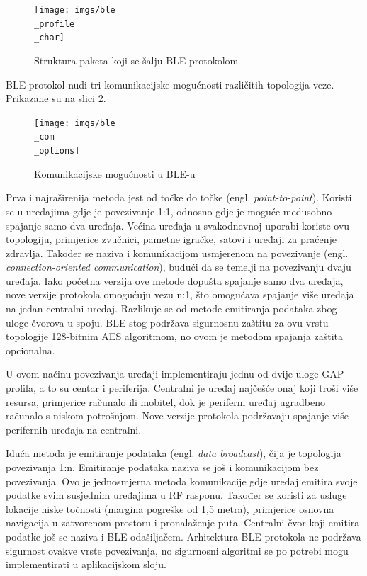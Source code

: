 \begin{figure}[ht]
	\centering
	\texttt{[image: imgs/ble\\\_profile\\\_char]}
	\caption{Struktura paketa koji se šalju BLE protokolom \cite{ble_profile_char}}
	\label{fig:ble_profile_char}
\end{figure}


BLE protokol nudi tri komunikacijske mogućnosti različitih topologija veze. Prikazane su na slici \ref{fig:ble_com_options}. 

\begin{figure}[ht]
	\centering
	\texttt{[image: imgs/ble\\\_com\\\_options]}
	\caption{Komunikacijske mogućnosti u BLE-u \cite{ble_profiles}}
	\label{fig:ble_com_options}
\end{figure}

Prva i najraširenija metoda jest od točke do točke (engl. \textit{point-to-point}). Koristi se u uređajima gdje je povezivanje 1:1, odnosno gdje je moguće međusobno spajanje samo dva uređaja. Većina uređaja u svakodnevnoj uporabi koriste ovu topologiju, primjerice zvučnici, pametne igračke, satovi i uređaji za praćenje zdravlja. Također se naziva i komunikacijom usmjerenom na povezivanje (engl. \textit{connection-oriented communication}), budući da se temelji na povezivanju dvaju uređaja. Iako početna verzija ove metode dopušta spajanje samo dva uređaja, nove verzije protokola omogućuju vezu n:1, što omogućava spajanje više uređaja na jedan centralni uređaj. Razlikuje se od metode emitiranja podataka zbog uloge čvorova u spoju. BLE stog podržava sigurnosnu zaštitu za ovu vrstu topologije 128-bitnim AES algoritmom, no ovom je metodom spajanja zaštita opcionalna. 

U ovom načinu povezivanja uređaji implementiraju jednu od dvije uloge GAP profila, a to su centar i periferija. Centralni je uređaj najčešće onaj koji troši više resursa, primjerice računalo ili mobitel, dok je periferni uređaj ugradbeno računalo s niskom potrošnjom. Nove verzije protokola podržavaju spajanje više perifernih uređaja na centralni.

Iduća metoda je emitiranje podataka (engl. \textit{data broadcast}), čija je topologija povezivanja 1:n. Emitiranje podataka naziva se još i komunikacijom bez povezivanja. Ovo je jednosmjerna metoda komunikacije gdje uređaj emitira svoje podatke svim susjednim uređajima u RF rasponu. Također se koristi za usluge lokacije niske točnosti (margina pogreške od 1,5 metra), primjerice osnovna navigacija u zatvorenom prostoru i pronalaženje puta. Centralni čvor koji emitira podatke još se naziva i BLE odašiljačem. Arhitektura BLE protokola ne podržava sigurnost ovakve vrste povezivanja, no sigurnosni algoritmi se po potrebi mogu implementirati u aplikacijskom sloju. 

